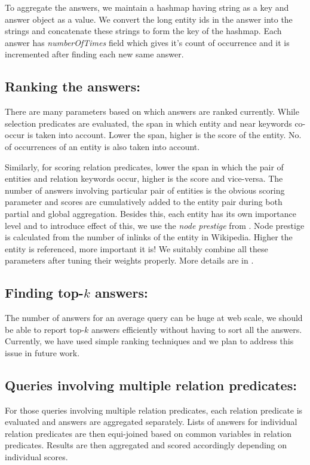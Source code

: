 \documentclass[11pt]{report}
\begin{document}
To aggregate the answers, we maintain a hashmap having string as a key and answer object as a value. We convert the long entity ids in the answer
into the strings and concatenate these strings to form the key of the hashmap. Each answer has \textit{numberOfTimes} field which gives it's count of
occurrence and it is incremented after finding each new same answer.

\subsection{Ranking the answers:}
There are many parameters based on which answers are ranked currently. While selection predicates are evaluated, the span in which entity and near keywords
co-occur is taken into account. Lower the span, higher is the score of the entity. No. of occurrences of an entity is also taken into account.

Similarly, for scoring relation predicates, lower the span in which the pair of entities and relation keywords occur, higher is the score and vice-versa. 
The number of answers involving particular pair of entities is the obvious scoring parameter and scores are cumulatively added to the entity pair during 
both partial and global aggregation. Besides this, each entity has its own importance level and to introduce effect of this, we use the \textit{node prestige}
from \cite{wikibanks}. Node prestige is calculated from the number of inlinks of the entity in Wikipedia. Higher the entity is referenced, more important it is!
We suitably combine all these parameters after tuning their weights properly. More details are in \cite{zibran}.
\subsection{Finding top-$k$ answers:}
The number of answers for an average query can be huge at web scale, we should be able to report top-$k$ answers efficiently without having to sort
all the answers. Currently, we have used simple ranking techniques and we plan to address this issue in future work.

\subsection{Queries involving multiple relation predicates:}
For those queries involving multiple relation predicates, each relation predicate is evaluated and answers are aggregated separately. 
Lists of answers for individual relation predicates are then equi-joined based on common variables in relation predicates. Results are then aggregated
and scored accordingly depending on individual scores. 
\end{document}
